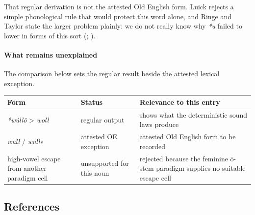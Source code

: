 \documentclass[
  british,
  a4paper,
]{article}
\newcounter{none} %
\begin{document}
That regular derivation is not the attested Old English form. Luick
rejects a simple phonological rule that would protect this word alone,
and Ringe and Taylor state the larger problem plainly: we do not really
know why \emph{*u} failed to lower in forms of this sort
(;
).

\paragraph{What remains unexplained}\label{what-remains-unexplained}

The comparison below sets the regular result beside the attested lexical
exception.

{\def\LTcaptype{none} %
\begin{longtable}[]{@{}
  >{\raggedright\arraybackslash}p{}
  >{\raggedright\arraybackslash}p{}
  >{\raggedright\arraybackslash}p{}@{}}
\toprule\noalign{}
\begin{minipage}[b]{\linewidth}\raggedright
Form
\end{minipage} & \begin{minipage}[b]{\linewidth}\raggedright
Status
\end{minipage} & \begin{minipage}[b]{\linewidth}\raggedright
Relevance to this entry
\end{minipage} \\
\midrule\noalign{}
\endhead
\bottomrule\noalign{}
\endlastfoot
\emph{*wúllō} \textgreater{} \emph{woll} & regular output & shows what
the deterministic sound laws produce \\
\emph{wull} / \emph{wulle} & attested OE exception & attested Old
English form to be recorded \\
high-vowel escape from another paradigm cell & unsupported for this noun
& rejected because the feminine ō-stem paradigm supplies no suitable
escape cell \\
\end{longtable}
}

\clearpage

\subsection*{References}\label{references}
\end{document}
